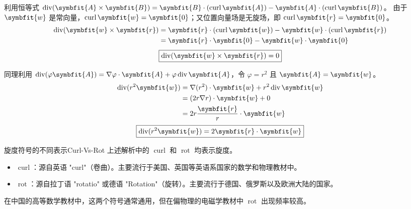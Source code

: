 \begin{solution}
    利用恒等式 $\operatorname{div} (\symbfit{A} \times \symbfit{B}) = \symbfit{B} \cdot (\operatorname{curl} \symbfit{A}) - \symbfit{A} \cdot (\operatorname{curl} \symbfit{B})$。
    由于 $\symbfit{w}$ 是常向量，$\operatorname{curl} \symbfit{w} = \symbfit{0}$；又位置向量场是无旋场，即 $\operatorname{curl} \symbfit{r} = \symbfit{0}$。
    \begin{equation}
        \begin{aligned}
            \operatorname{div} (\symbfit{w} \times \symbfit{r}) & = \symbfit{r} \cdot (\operatorname{curl} \symbfit{w}) - \symbfit{w} \cdot (\operatorname{curl} \symbfit{r}) \\
                                                                & = \symbfit{r} \cdot \symbfit{0} - \symbfit{w} \cdot \symbfit{0}
        \end{aligned}
    \end{equation}
    \begin{equation}
        \boxed{\operatorname{div} (\symbfit{w} \times \symbfit{r}) = 0}
    \end{equation}


    同理利用 $\operatorname{div} (\varphi \symbfit{A}) = \nabla \varphi \cdot \symbfit{A} + \varphi \operatorname{div} \symbfit{A}$，令 $\varphi = r^2$ 且 $\symbfit{A} = \symbfit{w}$。
    \begin{equation}
        \begin{aligned}
            \operatorname{div} (r^2 \symbfit{w}) & = \nabla(r^2) \cdot \symbfit{w} + r^2 \operatorname{div} \symbfit{w} \\
                                                 & = (2r \nabla r) \cdot \symbfit{w} + 0                                \\
                                                 & = 2r \frac{\symbfit{r}}{r} \cdot \symbfit{w}
        \end{aligned}
    \end{equation}
    \begin{equation}
        \boxed{\operatorname{div} (r^2 \symbfit{w}) = 2 \symbfit{r} \cdot \symbfit{w}}
    \end{equation}
\end{solution}

\begin{note}{旋度符号的不同表示}{Curl-Vs-Rot}
    上述解析中的 $\operatorname{curl}$ 和 $\operatorname{rot}$ 均表示旋度。
    \begin{itemize}
        \item $\operatorname{curl}$：源自英语 "curl"（卷曲）。主要流行于美国、英国等英语系国家的数学和物理教材中。
        \item $\operatorname{rot}$：源自拉丁语 "rotatio" 或德语 "Rotation"（旋转）。主要流行于德国、俄罗斯以及欧洲大陆的国家。
    \end{itemize}
    在中国的高等数学教材中，这两个符号通常通用，但在偏物理的电磁学教材中 $\operatorname{rot}$ 出现频率较高。
\end{note}


